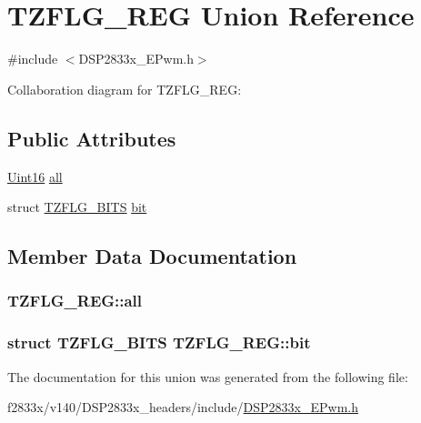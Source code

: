 \hypertarget{union_t_z_f_l_g___r_e_g}{}\section{T\+Z\+F\+L\+G\+\_\+\+R\+E\+G Union Reference}
\label{union_t_z_f_l_g___r_e_g}


{\ttfamily \#include $<$D\+S\+P2833x\+\_\+\+E\+Pwm.\+h$>$}



Collaboration diagram for T\+Z\+F\+L\+G\+\_\+\+R\+E\+G\+:
\subsection*{Public Attributes}
\begin{DoxyCompactItemize}
\item 
\hyperlink{_d_s_p2833x___device_8h_a59a9f6be4562c327cbfb4f7e8e18f08b}{Uint16} \hyperlink{union_t_z_f_l_g___r_e_g_a9dff2c4e35377deddb81f631a03e26ac}{all}
\item 
struct \hyperlink{struct_t_z_f_l_g___b_i_t_s}{T\+Z\+F\+L\+G\+\_\+\+B\+I\+T\+S} \hyperlink{union_t_z_f_l_g___r_e_g_a29e81c4bfff5247ef4abe545db4897c8}{bit}
\end{DoxyCompactItemize}


\subsection{Member Data Documentation}
\hypertarget{union_t_z_f_l_g___r_e_g_a9dff2c4e35377deddb81f631a03e26ac}{}
\subsubsection[{all}]{ T\+Z\+F\+L\+G\+\_\+\+R\+E\+G\+::all}\label{union_t_z_f_l_g___r_e_g_a9dff2c4e35377deddb81f631a03e26ac}
\hypertarget{union_t_z_f_l_g___r_e_g_a29e81c4bfff5247ef4abe545db4897c8}{}
\subsubsection[{bit}]{\setlength{\rightskip}{0pt plus 5cm}struct {\bf T\+Z\+F\+L\+G\+\_\+\+B\+I\+T\+S} T\+Z\+F\+L\+G\+\_\+\+R\+E\+G\+::bit}\label{union_t_z_f_l_g___r_e_g_a29e81c4bfff5247ef4abe545db4897c8}


The documentation for this union was generated from the following file\+:\begin{DoxyCompactItemize}
\item 
f2833x/v140/\+D\+S\+P2833x\+\_\+headers/include/\hyperlink{_d_s_p2833x___e_pwm_8h}{D\+S\+P2833x\+\_\+\+E\+Pwm.\+h}\end{DoxyCompactItemize}
